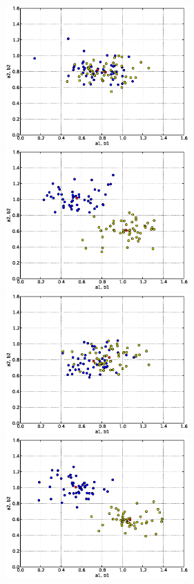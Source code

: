 \begin{figure}
  \begin{center}
    \includegraphics[width=7cm]{chapters/schroll/eps/4Dsample1-5.eps}
    \includegraphics[width=7cm]{chapters/schroll/eps/4Dsample1b-5.eps}
    \includegraphics[width=7cm]{chapters/schroll/eps/4Dsample2-5.eps}
    \includegraphics[width=7cm]{chapters/schroll/eps/4Dsample2b-5.eps}

\end{center}
\end{figure}
